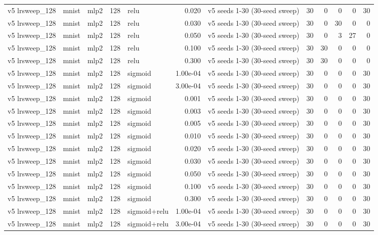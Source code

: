 \begin{table}[htbp]
{\begin{tabular}{@{}lllrlrlrrrrr@{}}
v5 lrsweep\_128 & mnist & mlp2 & 128 & relu & 0.020 & v5 seeds 1-30 (30-seed sweep) & 30 & 0 & 0 & 0 & 30 \\
v5 lrsweep\_128 & mnist & mlp2 & 128 & relu & 0.030 & v5 seeds 1-30 (30-seed sweep) & 30 & 0 & 30 & 0 & 0 \\
v5 lrsweep\_128 & mnist & mlp2 & 128 & relu & 0.050 & v5 seeds 1-30 (30-seed sweep) & 30 & 0 & 3 & 27 & 0 \\
v5 lrsweep\_128 & mnist & mlp2 & 128 & relu & 0.100 & v5 seeds 1-30 (30-seed sweep) & 30 & 30 & 0 & 0 & 0 \\
v5 lrsweep\_128 & mnist & mlp2 & 128 & relu & 0.300 & v5 seeds 1-30 (30-seed sweep) & 30 & 30 & 0 & 0 & 0 \\
v5 lrsweep\_128 & mnist & mlp2 & 128 & sigmoid & 1.00e-04 & v5 seeds 1-30 (30-seed sweep) & 30 & 0 & 0 & 0 & 30 \\
v5 lrsweep\_128 & mnist & mlp2 & 128 & sigmoid & 3.00e-04 & v5 seeds 1-30 (30-seed sweep) & 30 & 0 & 0 & 0 & 30 \\
v5 lrsweep\_128 & mnist & mlp2 & 128 & sigmoid & 0.001 & v5 seeds 1-30 (30-seed sweep) & 30 & 0 & 0 & 0 & 30 \\
v5 lrsweep\_128 & mnist & mlp2 & 128 & sigmoid & 0.003 & v5 seeds 1-30 (30-seed sweep) & 30 & 0 & 0 & 0 & 30 \\
v5 lrsweep\_128 & mnist & mlp2 & 128 & sigmoid & 0.005 & v5 seeds 1-30 (30-seed sweep) & 30 & 0 & 0 & 0 & 30 \\
v5 lrsweep\_128 & mnist & mlp2 & 128 & sigmoid & 0.010 & v5 seeds 1-30 (30-seed sweep) & 30 & 0 & 0 & 0 & 30 \\
v5 lrsweep\_128 & mnist & mlp2 & 128 & sigmoid & 0.020 & v5 seeds 1-30 (30-seed sweep) & 30 & 0 & 0 & 0 & 30 \\
v5 lrsweep\_128 & mnist & mlp2 & 128 & sigmoid & 0.030 & v5 seeds 1-30 (30-seed sweep) & 30 & 0 & 0 & 0 & 30 \\
v5 lrsweep\_128 & mnist & mlp2 & 128 & sigmoid & 0.050 & v5 seeds 1-30 (30-seed sweep) & 30 & 0 & 0 & 0 & 30 \\
v5 lrsweep\_128 & mnist & mlp2 & 128 & sigmoid & 0.100 & v5 seeds 1-30 (30-seed sweep) & 30 & 0 & 0 & 0 & 30 \\
v5 lrsweep\_128 & mnist & mlp2 & 128 & sigmoid & 0.300 & v5 seeds 1-30 (30-seed sweep) & 30 & 0 & 0 & 0 & 30 \\
v5 lrsweep\_128 & mnist & mlp2 & 128 & sigmoid+relu & 1.00e-04 & v5 seeds 1-30 (30-seed sweep) & 30 & 0 & 0 & 0 & 30 \\
v5 lrsweep\_128 & mnist & mlp2 & 128 & sigmoid+relu & 3.00e-04 & v5 seeds 1-30 (30-seed sweep) & 30 & 0 & 0 & 0 & 30 \\

\end{tabular}}
\end{table}
